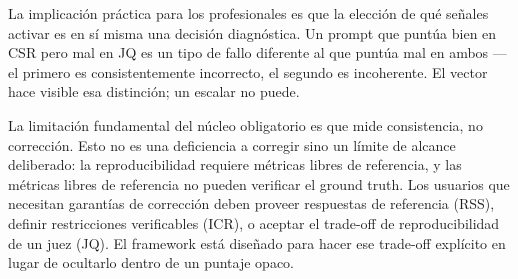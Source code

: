 \documentclass[11pt,a4paper]{article}
\begin{document}
La implicación práctica para los profesionales es que la elección de qué señales activar es en sí misma una decisión diagnóstica. Un prompt que puntúa bien en CSR pero mal en JQ es un tipo de fallo diferente al que puntúa mal en ambos --- el primero es consistentemente incorrecto, el segundo es incoherente. El vector hace visible esa distinción; un escalar no puede.

La limitación fundamental del núcleo obligatorio es que mide consistencia, no corrección. Esto no es una deficiencia a corregir sino un límite de alcance deliberado: la reproducibilidad requiere métricas libres de referencia, y las métricas libres de referencia no pueden verificar el ground truth. Los usuarios que necesitan garantías de corrección deben proveer respuestas de referencia (RSS), definir restricciones verificables (ICR), o aceptar el trade-off de reproducibilidad de un juez (JQ). El framework está diseñado para hacer ese trade-off explícito en lugar de ocultarlo dentro de un puntaje opaco.



\end{document}
